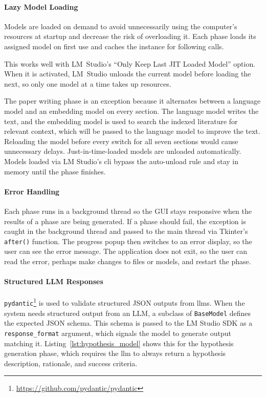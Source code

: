 \paragraph{Lazy Model Loading}
Models are loaded on demand to avoid unnecessarily using the computer's resources at startup and decrease the risk of overloading it.
Each phase loads its assigned model on first use and caches the instance for following calls.

This works well with LM~Studio's ``Only Keep Last JIT Loaded Model'' option.
When it is activated, LM~Studio unloads the current model before loading the next, so only one model at a time takes up resources.

The paper writing phase is an exception because it alternates between a language model and an embedding model on every section.
The language model writes the text, and the embedding model is used to search the indexed literature for relevant context, which will be passed to the language model to improve the text.
Reloading the model before every switch for all seven sections would cause unnecessary delays.
Just-in-time-loaded models are unloaded automatically.
Models loaded via LM Studio's \gls{cli} bypass the auto-unload rule and stay in memory until the phase finishes.

\paragraph{Error Handling}
Each phase runs in a background thread so the GUI stays responsive when the results of a phase are being generated.
If a phase should fail, the exception is caught in the background thread and passed to the main thread via Tkinter's \texttt{after()} function.
The progress popup then switches to an error display, so the user can see the error message.
The application does not exit, so the user can read the error, perhaps make changes to files or models, and restart the phase.

\paragraph{Structured LLM Responses} %
\texttt{pydantic}\footnote{\url{https://github.com/pydantic/pydantic}} is used to validate structured JSON outputs from \glspl{llm}.
When the system needs structured output from an LLM, a subclass of \texttt{BaseModel} defines the expected JSON schema.
This schema is passed to the LM Studio SDK as a \texttt{response\_format} argument, which signals the model to generate output matching it.
Listing~\ref{lst:hypothesis_model} shows this for the hypothesis generation phase, which requires the \gls{llm} to always return a hypothesis description, rationale, and success criteria.

